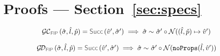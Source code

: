 

\newpage
\section{Proofs --- Section~\ref{sec:specs}}


\newcommand{\unificationfunction}{\textsc{Unification}}
\newcommand{\extendedunificationfunction}{\underline{\textsc{Unification}}}
\newcommand{\emptystate}{\emptyset}
\newcommand{\stateequiv}{\sim}
\newcommand{\stateequivrel}[3]{#1 \sim_{#3} #2}




\begin{lemma}\label{lemma:getcell:fip}
$$
\begin{array}{l}
\GetCellV{\sstate, \sloc, \sexprp} = \success{\sexprv', \sstate'} 
    \implies 
        \stateequivrel{\sstate}{\sstate' \statecompose \normaliser((\sloc, \sexprp) \pointsto \sexprv')}{}
\end{array}
$$
\end{lemma}


\begin{lemma}\label{lemma:getdomain:fip}
$$
\begin{array}{l}
\GetDomainV{\sstate, \sloc, \sexprp} = \success{\sexprv', \sstate'} 
    \implies 
        \stateequivrel{\sstate}{\sstate' \statecompose \normaliser(\emptyfields{\sloc}{\sexprv'})}{}
\end{array}
$$
\end{lemma}


